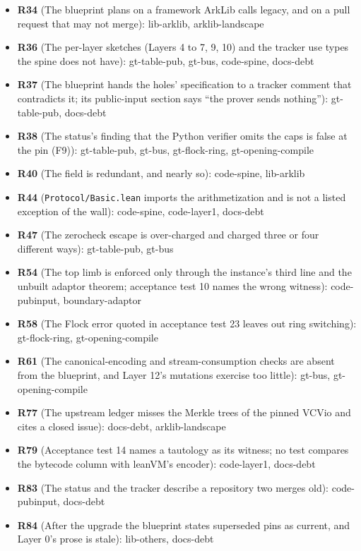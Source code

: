 \begin{itemize}
\item \textbf{R34} (The blueprint plans on a framework ArkLib calls legacy, and on a pull request that may not merge): lib-arklib, arklib-landscape
\item \textbf{R36} (The per-layer sketches (Layers 4 to 7, 9, 10) and the tracker use types the spine does not have): gt-table-pub, gt-bus, code-spine, docs-debt
\item \textbf{R37} (The blueprint hands the holes' specification to a tracker comment that contradicts it; its public-input section says ``the prover sends nothing''): gt-table-pub, docs-debt
\item \textbf{R38} (The status's finding that the Python verifier omits the caps is false at the pin (F9)): gt-table-pub, gt-bus, gt-flock-ring, gt-opening-compile
\item \textbf{R40} (The  field is redundant, and  nearly so): code-spine, lib-arklib
\item \textbf{R44} (\texttt{Protocol/\allowbreak{}Basic.\allowbreak{}lean} imports the arithmetization and is not a listed exception of the wall): code-spine, code-layer1, docs-debt
\item \textbf{R47} (The zerocheck escape is over-charged and charged three or four different ways): gt-table-pub, gt-bus
\item \textbf{R54} (The top limb is enforced only through the instance's third line and the unbuilt adaptor theorem; acceptance test 10 names the wrong witness): code-pubinput, boundary-adaptor
\item \textbf{R58} (The Flock error quoted in acceptance test 23 leaves out ring switching): gt-flock-ring, gt-opening-compile
\item \textbf{R61} (The canonical-encoding and stream-consumption checks are absent from the blueprint, and Layer 12's mutations exercise too little): gt-bus, gt-opening-compile
\item \textbf{R77} (The upstream ledger misses the Merkle trees of the pinned VCVio and cites a closed issue): docs-debt, arklib-landscape
\item \textbf{R79} (Acceptance test 14 names a tautology as its witness; no test compares the bytecode column with leanVM's encoder): code-layer1, docs-debt
\item \textbf{R83} (The status and the tracker describe a repository two merges old): code-pubinput, docs-debt
\item \textbf{R84} (After the upgrade the blueprint states superseded pins as current, and Layer 0's prose is stale): lib-others, docs-debt

\end{itemize}
